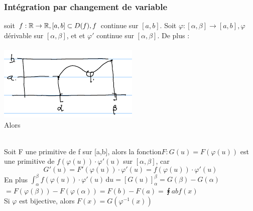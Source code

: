 \documentclass[12pt,a4paper]{article}
\begin{document}
{\subsubsection{Intégration par changement de variable}
\begin{boite}
	\Theoreme soit $f:\mathbb{R} \to \mathbb{R}, [a,b] \subset D(f), f$ continue sur $[a,b]$. Soit $\varphi : [\alpha,\beta]\to[a,b], \varphi$ dérivable sur $[\alpha,\beta]$, et et $\varphi'$ continue sur $[\alpha,\beta]$. De plus :\\
	\\
	\includegraphics[scale=0.8]{illustrations_analyse/integ_partie}\\
	Alors 
\end{boite}
\\
Soit F une primitive de f sur [a,b], alors la fonction$F : G(u) = F(\varphi(u))$ est une primitive de $f(\varphi(u)) \cdot \varphi'(u)$ sur $[\alpha,\beta]$, car
\begin{equation}
	G'(u) = F'(\varphi(u)) \cdot \varphi'(u) = f(\varphi(u)) \cdot \varphi'(u)
\end{equation}
En plus $\int_\alpha^\beta f(\varphi(u)) \cdot \varphi'(u) \, \mathrm du = [G(u)]_\alpha^\beta = G(\beta)-G(\alpha)$\\
$ = F(\varphi(\beta)) - F(\varphi(\alpha)) = F(b) -F(a) = \intx{a}{b}{f(x)}$\\
  Si $\varphi$ est bijective, alors $F(x) = G(\varphi^{-1}(x))$

}
\end{document}
